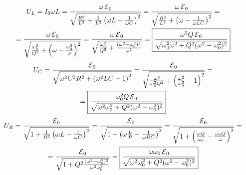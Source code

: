 \begin{multline} \label{eq:th:add:1}
	U_L 
	= 
	I_0 \omega L 
	= 
	\frac{\omega \operatorname{\mathcal{E}}_0}{\sqrt{\frac{R^2}{L^2} + \frac{1}{L^2}\left(\omega L - \frac{1}{\omega C}\right)^2}} 
	= 
	\frac{\omega \operatorname{\mathcal{E}}_0}{\sqrt{\frac{R^2}{L^2} + \left(\omega - \frac{1}{\omega LC}\right)^2}}
	=\\=
	\frac{\omega \operatorname{\mathcal{E}}_0}{\sqrt{\frac{\omega_0^2}{Q^2} + \left(\omega - \frac{\omega_0^2}{\omega}\right)^2}}
	=
	\frac{\omega \operatorname{\mathcal{E}}_0}{\sqrt{\frac{\omega_0^2}{Q^2} + \frac{(\omega^2 - \omega_0^2)^2}{\omega^2}}} 
	= 
	\boxed{\frac{\omega^2Q \operatorname{\mathcal{E}}_0}{\sqrt{\omega_0^2 \omega^2 + Q^2 (\omega^2 - \omega_0^2)^2}}}
\end{multline}
\begin{multline} \label{eq:th:add:2}
	U_C 
	= 
	\frac{\operatorname{\mathcal{E}}_0}{\sqrt{\omega^2 C^2 R^2 + \left(\omega^2 LC - 1\right)^2}}
	=
	\frac{\operatorname{\mathcal{E}}_0}{\sqrt{\frac{\omega^2}{\omega_0^2 Q^2} + \left(\frac{\omega^2}{\omega_0^2} - 1\right)^2}}
	=\\=
	\boxed{\frac{\omega_0^2 Q \operatorname{\mathcal{E}}_0}{\sqrt{\omega^2 \omega_0^2 + Q^2 (\omega^2 - \omega_0^2)^2}}}
\end{multline}
\begin{multline} \label{eq:th:add:3}
	U_R 
	= 
	\frac{\operatorname{\mathcal{E}}_0}{\sqrt{1 + \frac{1}{R^2}\left(\omega L - \frac{1}{\omega C}\right)^2}}
	=
	\frac{\operatorname{\mathcal{E}}_0}{\sqrt{1 + \left(\omega \frac{L}{R} - \frac{1}{\omega RC}\right)^2}}
	=
	\frac{\operatorname{\mathcal{E}}_0}{\sqrt{1 + \left(\frac{\omega Q}{\omega_0} - \frac{\omega_0 Q}{\omega }\right)^2}}
	=\\=
	\frac{\operatorname{\mathcal{E}}_0}{\sqrt{1 + Q^2\frac{(\omega^2 - \omega_0^2)^2}{\omega^2 \omega_0^2}}}
	=
	\boxed{\frac{ \omega \omega_0 \operatorname{\mathcal{E}}_0}{\sqrt{\omega^2 \omega_0^2 + Q^2 (\omega^2 - \omega_0^2)^2}}}
\end{multline}

